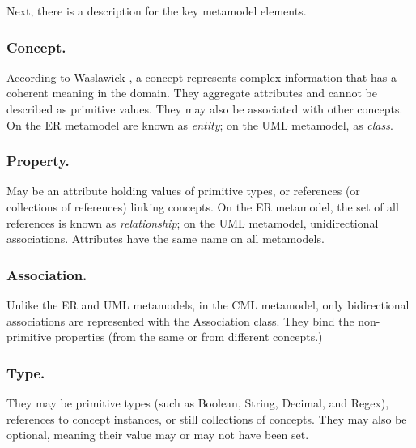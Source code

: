 Next, there is a description for the key metamodel elements.

\subsubsection{Concept.}

According to Waslawick \cite{wazlawick},
a concept represents complex information that has a coherent meaning in the domain.
They aggregate attributes and cannot be described as primitive values.
They may also be associated with other concepts.
On the ER metamodel are known as \emph{entity};
on the UML metamodel, as \emph{class}.

\subsubsection{Property.}

May be an attribute holding values of primitive types,
or references (or collections of references) linking concepts.
On the ER metamodel,
the set of all references is known as \emph{relationship};
on the UML metamodel, unidirectional associations.
Attributes have the same name on all metamodels.

\subsubsection{Association.}

Unlike the ER and UML metamodels, in the CML metamodel, only bidirectional associations are represented with the Association class. They bind the non-primitive properties (from the same or from different concepts.) 


\subsubsection{Type.} They may be primitive types (such as Boolean, String, Decimal, and Regex), references to concept instances, or still collections of concepts. They may also be optional, meaning their value may or may not have been set.
